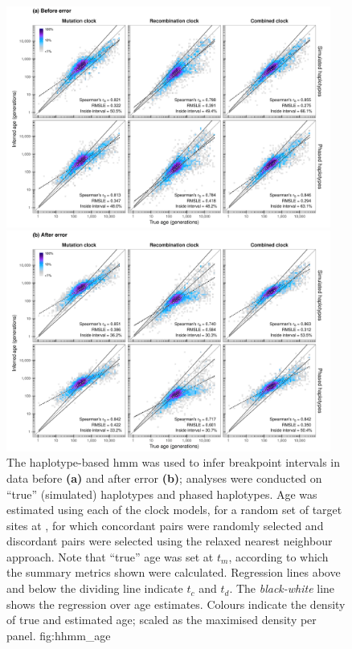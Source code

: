 

\begin{figure}[p]
\centering
\vspace*{-5pt}
\includegraphics[width=0.95\textwidth]{./img/ch5/hhmm_age_A}
\includegraphics[width=0.95\textwidth]{./img/ch5/hhmm_age_B}
{The haplotype-based \gls{hmm} was used to infer breakpoint intervals in data before \textbf{(a)} and after error \textbf{(b)}; analyses were conducted on ``true'' (simulated) haplotypes and phased haplotypes.
Age was estimated using each of the  clock models, for a random set of  target sites at , for which  concordant pairs were randomly selected and  discordant pairs were selected using the relaxed nearest neighbour approach.
Note that ``true'' age was set at $t_m$, according to which the summary metrics shown were calculated.
Regression lines above and below the dividing line indicate $t_c$ and $t_d$.
The \emph{black-white} line shows the regression over age estimates.
Colours indicate the density of true and estimated age; scaled as the maximised density per panel.}
{fig:hhmm_age}
\end{figure}
